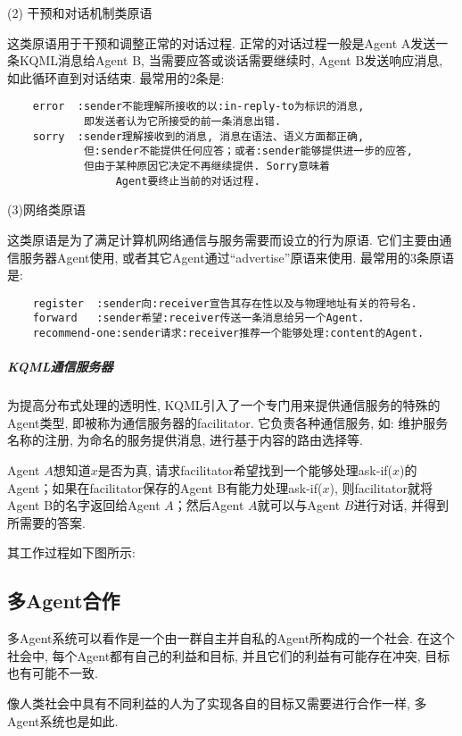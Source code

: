 (2) 干预和对话机制类原语

    这类原语用于干预和调整正常的对话过程. 正常的对话过程一般是Agent A发送一条KQML消息给Agent B, 当需要应答或谈话需要继续时, Agent B发送响应消息, 如此循环直到对话结束. 最常用的2条是:
\begin{Verbatim}
    error  :sender不能理解所接收的以:in-reply-to为标识的消息,
            即发送者认为它所接受的前一条消息出错.
    sorry  :sender理解接收到的消息, 消息在语法、语义方面都正确,
            但:sender不能提供任何应答；或者:sender能够提供进一步的应答,
            但由于某种原因它决定不再继续提供. Sorry意味着
                 Agent要终止当前的对话过程.
\end{Verbatim}

(3)网络类原语

    这类原语是为了满足计算机网络通信与服务需要而设立的行为原语. 它们主要由通信服务器Agent使用, 或者其它Agent通过“advertise”原语来使用. 最常用的3条原语是:
\begin{Verbatim}
    register  :sender向:receiver宣告其存在性以及与物理地址有关的符号名.
    forward   :sender希望:receiver传送一条消息给另一个Agent.
    recommend-one:sender请求:receiver推荐一个能够处理:content的Agent.
\end{Verbatim}
\subparagraph{KQML通信服务器}
为提高分布式处理的透明性, KQML引入了一个专门用来提供通信服务的特殊的Agent类型, 即被称为通信服务器的facilitator. 它负责各种通信服务, 如: 维护服务名称的注册, 为命名的服务提供消息, 进行基于内容的路由选择等.
\begin{example}
  Agent $A$想知道$x$是否为真, 请求facilitator希望找到一个能够处理ask-if($x$)的Agent；如果在facilitator保存的Agent B有能力处理ask-if($x$), 则facilitator就将Agent B的名字返回给Agent $A$；然后Agent $A$就可以与Agent $B$进行对话, 并得到所需要的答案.
\end{example}

其工作过程如下图所示:

\subsection{多Agent合作}
多Agent系统可以看作是一个由一群自主并自私的Agent所构成的一个社会. 在这个社会中, 每个Agent都有自己的利益和目标, 并且它们的利益有可能存在冲突, 目标也有可能不一致.

像人类社会中具有不同利益的人为了实现各自的目标又需要进行合作一样, 多Agent系统也是如此.

